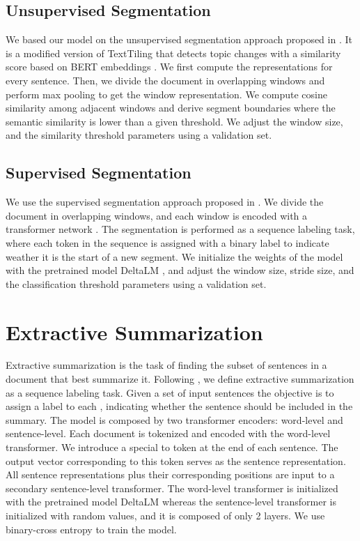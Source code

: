 \documentclass[sigconf]{acmart}
\begin{document}
\subsection{Unsupervised Segmentation}
We based our model on the unsupervised segmentation approach proposed in \cite{solbiati2021unsupervised}. It is a modified version of TextTiling \cite{hearst-1997-text} that detects topic changes with a similarity score based on BERT embeddings \cite{devlin-etal-2019-bert}. We first compute the representations for every sentence. Then, we divide the document in overlapping windows and perform max pooling to get the window representation. We compute cosine similarity among adjacent windows and derive segment boundaries where the semantic similarity is lower than a given threshold.
We adjust the window size, and the similarity threshold parameters using a validation set.

\subsection{Supervised Segmentation}
We use the supervised segmentation approach proposed in \cite{zhang2021sequence}. We divide the document in overlapping windows, and each window is encoded with a transformer network \cite{10.5555/3295222.3295349}. The segmentation is performed as a sequence labeling task, where each token in the sequence is assigned with a binary label to indicate weather it is the start of a new segment. We initialize the weights of the model with the pretrained model DeltaLM \cite{ma2021deltalm}, and adjust the window size, stride size, and the classification threshold parameters using a validation set.

\section{Extractive Summarization}\label{sec:sum}
Extractive summarization is the task of finding the subset of sentences in a document that best summarize it. Following \cite{liu-lapata-2019-text}, we define extractive summarization as a sequence labeling task.  Given a set of input sentences  the objective is to assign a label  to each , indicating whether the sentence should be included in the summary. The model is composed by two transformer encoders: word-level and sentence-level. Each document is tokenized and encoded with the word-level transformer. We introduce a special to token  at the end of each sentence. The output vector corresponding to  this token serves as the sentence representation. All sentence representations plus their corresponding positions are input to a secondary sentence-level transformer. The word-level transformer is initialized with the pretrained model DeltaLM \cite{ma2021deltalm} whereas the sentence-level transformer is initialized with random values, and it is composed of only 2 layers. We use binary-cross entropy to train the model. 
\end{document}
